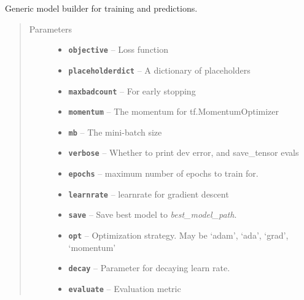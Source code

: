 \documentclass[letterpaper,10pt,english]{sphinxmanual}
\begin{document}
\begin{fulllineitems}
\label{generic_model:generic_model.Model}
Generic model builder for training and predictions.
\begin{quote}\begin{description}
\item[{Parameters}] \leavevmode\begin{itemize}
\item {} 
\textbf{\texttt{objective}} -- Loss function

\item {} 
\textbf{\texttt{placeholderdict}} -- A dictionary of placeholders

\item {} 
\textbf{\texttt{maxbadcount}} -- For early stopping

\item {} 
\textbf{\texttt{momentum}} -- The momentum for tf.MomentumOptimizer

\item {} 
\textbf{\texttt{mb}} -- The mini-batch size

\item {} 
\textbf{\texttt{verbose}} -- Whether to print dev error, and save\_tensor evals

\item {} 
\textbf{\texttt{epochs}} -- maximum number of epochs to train for.

\item {} 
\textbf{\texttt{learnrate}} -- learnrate for gradient descent

\item {} 
\textbf{\texttt{save}} -- Save best model to \emph{best\_model\_path}.

\item {} 
\textbf{\texttt{opt}} -- Optimization strategy. May be `adam', `ada', `grad', `momentum'

\item {} 
\textbf{\texttt{decay}} -- Parameter for decaying learn rate.

\item {} 
\textbf{\texttt{evaluate}} -- Evaluation metric


\end{itemize}
\end{description}
\end{quote}
\end{fulllineitems}
\end{document}
